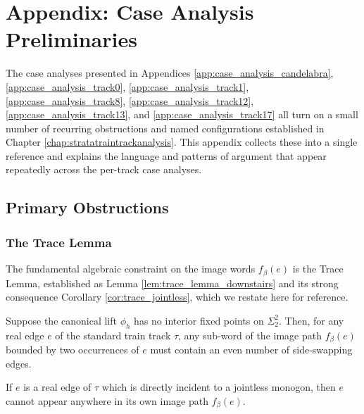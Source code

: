 \chapter{Appendix: Case Analysis Preliminaries}
\label{app:case_analysis_preliminaries}

The case analyses presented in Appendices \ref{app:case_analysis_candelabra}, \ref{app:case_analysis_track0}, \ref{app:case_analysis_track1}, \ref{app:case_analysis_track8}, \ref{app:case_analysis_track12}, \ref{app:case_analysis_track13}, and \ref{app:case_analysis_track17} all turn on a small number of recurring obstructions and named configurations established in Chapter \ref{chap:stratatraintrackanalysis}. This appendix collects these into a single reference and explains the language and patterns of argument that appear repeatedly across the per-track case analyses.

\section{Primary Obstructions}

\subsection{The Trace Lemma}
\label{sec:case_analysis_trace_lemma}

The fundamental algebraic constraint on the image words $f_\beta(e)$ is the Trace Lemma, established as Lemma \ref{lem:trace_lemma_downstairs} and its strong consequence Corollary \ref{cor:trace_jointless}, which we restate here for reference.

\begin{lemma}
\label{lem:trace_lemma_appendix}
Suppose the canonical lift $\phi_h$ has no interior fixed points on $\Sigma_2^2$. Then, for any real edge $e$ of the standard train track $\tau$, any sub-word of the image path $f_\beta(e)$ bounded by two occurrences of $e$ must contain an even number of side-swapping edges.
\end{lemma}

\begin{corollary}
\label{cor:trace_jointless_appendix}
If $e$ is a real edge of $\tau$ which is directly incident to a jointless monogon, then $e$ cannot appear anywhere in its own image path $f_\beta(e)$.
\end{corollary}

